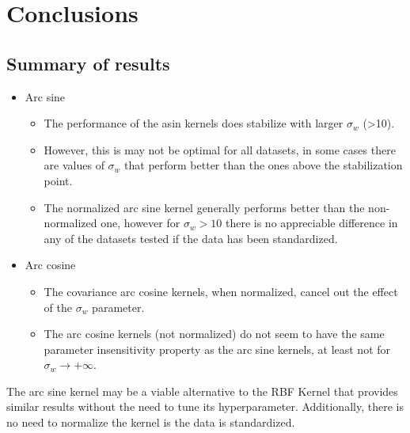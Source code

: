 \chapter{Conclusions}
\label{sec:conclusions}

\section{Summary of results}


\begin{itemize}
    \item Arc sine \begin{itemize}
              \item The performance of the asin kernels does stabilize with larger
                    $\sigma_w$ (>10).
              \item However, this is may not be optimal for all datasets, in some cases
                    there are values of $\sigma_w$ that perform better than the ones
                    above the stabilization point.
              \item The normalized arc sine kernel generally performs better than the
                    non-normalized one, however for $\sigma_w > 10$ there is no
                    appreciable difference in any of the datasets tested if the
                    data has been standardized.
          \end{itemize}
    \item Arc cosine \begin{itemize}
              \item The covariance arc cosine kernels, when normalized, cancel out the effect
                    of the $\sigma_w$ parameter.
              \item The arc cosine kernels (not normalized) do not seem to have the same parameter
                    insensitivity property as the arc sine kernels, at least not for
                    $\sigma_w \to +\infty$.
          \end{itemize}
\end{itemize}

The arc sine kernel may be a viable alternative to the RBF Kernel that provides
similar results without the need to tune its hyperparameter. Additionally, there
is no need to normalize the kernel is the data is standardized.

%
